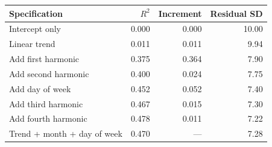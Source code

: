 \begin{tabular}{@{}lrrr@{}}
\toprule
Specification & $R^2$ & Increment & Residual SD \\
\midrule
Intercept only & 0.000 & 0.000 & 10.00 \\
Linear trend & 0.011 & 0.011 & 9.94 \\
Add first harmonic & 0.375 & 0.364 & 7.90 \\
Add second harmonic & 0.400 & 0.024 & 7.75 \\
Add day of week & 0.452 & 0.052 & 7.40 \\
Add third harmonic & 0.467 & 0.015 & 7.30 \\
Add fourth harmonic & 0.478 & 0.011 & 7.22 \\
\addlinespace
Trend + month + day of week & 0.470 & --- & 7.28 \\
\bottomrule
\end{tabular}
